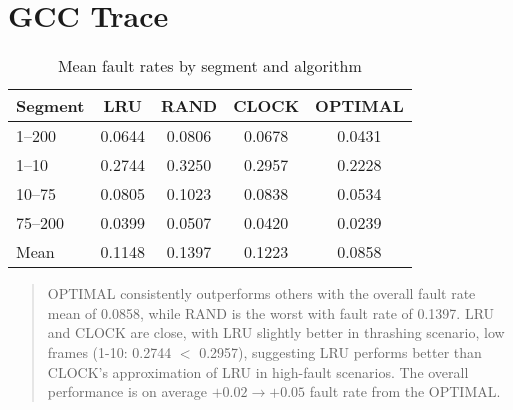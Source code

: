\documentclass[a4paper, 11pt]{report}
\begin{document}
\section*{GCC Trace}
    \begin{table}[ht]
        \centering
        \label{tab:means_plain}
        \begin{tabular}{l c c c c}
            \toprule
            Segment & LRU & RAND & CLOCK & OPTIMAL \\
            \hline
            1--200  & 0.0644 & 0.0806 & 0.0678 & 0.0431 \\
            1--10   & 0.2744 & 0.3250 & 0.2957 & 0.2228 \\
            10--75  & 0.0805 & 0.1023 & 0.0838 & 0.0534 \\
            75--200 & 0.0399 & 0.0507 & 0.0420 & 0.0239 \\
            \hline
            Mean    & 0.1148 & 0.1397 & 0.1223 & 0.0858 \\
            \bottomrule
        \end{tabular}
        \caption{Mean fault rates by segment and algorithm}
    \end{table}
    \begin{quote}
        OPTIMAL consistently outperforms others with the overall fault rate mean of 0.0858, while RAND is the worst with fault rate of 0.1397. LRU and CLOCK are close, with LRU slightly better in 
        thrashing scenario, low frames (1-10: 0.2744 $<$ 0.2957), suggesting LRU performs better than CLOCK's approximation of LRU in high-fault scenarios. 
        The overall performance is on average $+0.02\rightarrow+0.05$ fault rate from the OPTIMAL. 
    \end{quote}
\end{document}
